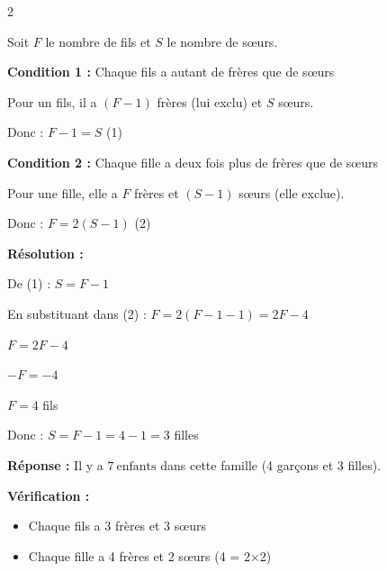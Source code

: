 \documentclass[11pt,a4paper]{article}
\begin{document}
\begin{tcolorbox}[colback=red!5!white,colframe=red!75!black]

\begin{multicols}{2}
    


Soit $F$ le nombre de fils et $S$ le nombre de sœurs.

\vspace{2mm}

\textbf{Condition 1 :} Chaque fils a autant de frères que de sœurs

Pour un fils, il a $(F-1)$ frères (lui exclu) et $S$ sœurs.

Donc : $F - 1 = S$ \quad (1)

\vspace{2mm}

\textbf{Condition 2 :} Chaque fille a deux fois plus de frères que de sœurs

Pour une fille, elle a $F$ frères et $(S-1)$ sœurs (elle exclue).

Donc : $F = 2(S-1)$ \quad (2)

\vspace{2mm}

\textbf{Résolution :}

De (1) : $S = F - 1$

En substituant dans (2) : $F = 2(F - 1 - 1) = 2F - 4$

$F = 2F - 4$

$-F = -4$

$F = 4$ fils

\vspace{2mm}

Donc : $S = F - 1 = 4 - 1 = 3$ filles

\vspace{2mm}

\textbf{Réponse :} Il y a $\boxed{7~\text{enfants}}$ dans cette famille (4 garçons et 3 filles).

\vspace{2mm}

\textbf{Vérification :}
\begin{itemize}
\item Chaque fils a 3 frères et 3 sœurs \checkmark
\item Chaque fille a 4 frères et 2 sœurs (4 = 2×2) \checkmark
\end{itemize}

\end{multicols}

\end{tcolorbox}

  \vfill 
  
\end{document}
